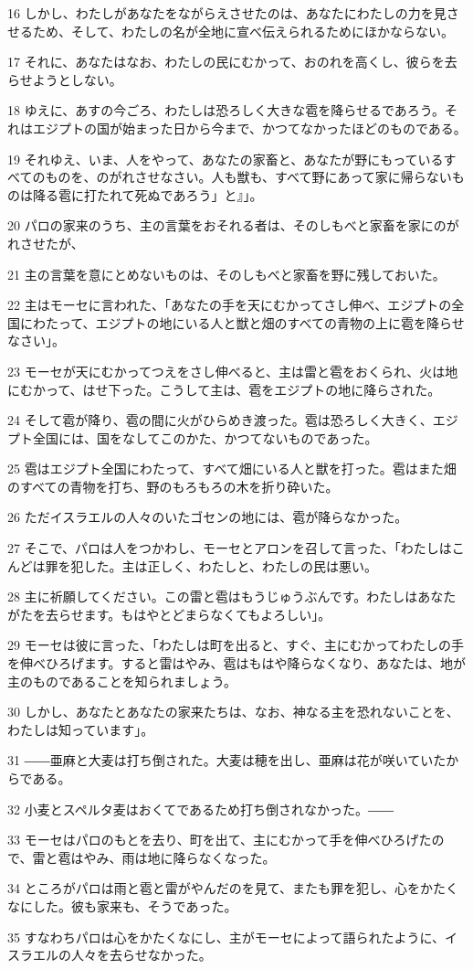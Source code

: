 \par 16 しかし、わたしがあなたをながらえさせたのは、あなたにわたしの力を見させるため、そして、わたしの名が全地に宣べ伝えられるためにほかならない。
\par 17 それに、あなたはなお、わたしの民にむかって、おのれを高くし、彼らを去らせようとしない。
\par 18 ゆえに、あすの今ごろ、わたしは恐ろしく大きな雹を降らせるであろう。それはエジプトの国が始まった日から今まで、かつてなかったほどのものである。
\par 19 それゆえ、いま、人をやって、あなたの家畜と、あなたが野にもっているすべてのものを、のがれさせなさい。人も獣も、すべて野にあって家に帰らないものは降る雹に打たれて死ぬであろう」と』」。
\par 20 パロの家来のうち、主の言葉をおそれる者は、そのしもべと家畜を家にのがれさせたが、
\par 21 主の言葉を意にとめないものは、そのしもべと家畜を野に残しておいた。
\par 22 主はモーセに言われた、「あなたの手を天にむかってさし伸べ、エジプトの全国にわたって、エジプトの地にいる人と獣と畑のすべての青物の上に雹を降らせなさい」。
\par 23 モーセが天にむかってつえをさし伸べると、主は雷と雹をおくられ、火は地にむかって、はせ下った。こうして主は、雹をエジプトの地に降らされた。
\par 24 そして雹が降り、雹の間に火がひらめき渡った。雹は恐ろしく大きく、エジプト全国には、国をなしてこのかた、かつてないものであった。
\par 25 雹はエジプト全国にわたって、すべて畑にいる人と獣を打った。雹はまた畑のすべての青物を打ち、野のもろもろの木を折り砕いた。
\par 26 ただイスラエルの人々のいたゴセンの地には、雹が降らなかった。
\par 27 そこで、パロは人をつかわし、モーセとアロンを召して言った、「わたしはこんどは罪を犯した。主は正しく、わたしと、わたしの民は悪い。
\par 28 主に祈願してください。この雷と雹はもうじゅうぶんです。わたしはあなたがたを去らせます。もはやとどまらなくてもよろしい」。
\par 29 モーセは彼に言った、「わたしは町を出ると、すぐ、主にむかってわたしの手を伸べひろげます。すると雷はやみ、雹はもはや降らなくなり、あなたは、地が主のものであることを知られましょう。
\par 30 しかし、あなたとあなたの家来たちは、なお、神なる主を恐れないことを、わたしは知っています」。
\par 31 ――亜麻と大麦は打ち倒された。大麦は穂を出し、亜麻は花が咲いていたからである。
\par 32 小麦とスペルタ麦はおくてであるため打ち倒されなかった。――
\par 33 モーセはパロのもとを去り、町を出て、主にむかって手を伸べひろげたので、雷と雹はやみ、雨は地に降らなくなった。
\par 34 ところがパロは雨と雹と雷がやんだのを見て、またも罪を犯し、心をかたくなにした。彼も家来も、そうであった。
\par 35 すなわちパロは心をかたくなにし、主がモーセによって語られたように、イスラエルの人々を去らせなかった。

